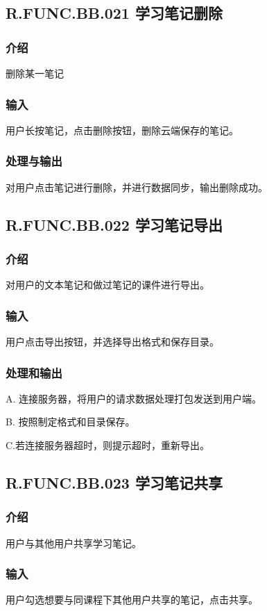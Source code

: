  \subsection{R.FUNC.BB.021 学习笔记删除}
    \subsubsection{介绍}
	删除某一笔记
    \subsubsection{输入}
	用户长按笔记，点击删除按钮，删除云端保存的笔记。
    \subsubsection{处理与输出}
	对用户点击笔记进行删除，并进行数据同步，输出删除成功。


 \subsection{R.FUNC.BB.022 学习笔记导出}
    \subsubsection{介绍}
	对用户的文本笔记和做过笔记的课件进行导出。
    \subsubsection{输入}
	用户点击导出按钮，并选择导出格式和保存目录。
    \subsubsection{处理和输出}
	A. 连接服务器，将用户的请求数据处理打包发送到用户端。

	B. 按照制定格式和目录保存。

	C.若连接服务器超时，则提示超时，重新导出。

 \subsection{R.FUNC.BB.023 学习笔记共享}
    \subsubsection{介绍}
	用户与其他用户共享学习笔记。
    \subsubsection{输入}
	用户勾选想要与同课程下其他用户共享的笔记，点击共享。
